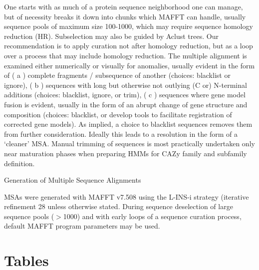 \documentclass{article}
\begin{document}
One starts with as much of a protein sequence neighborhood one can manage, but of necessity breaks it down into chunks which MAFFT can handle, usually sequence pools of maximum size 100-1000, which may require sequence homology reduction (HR). Subselection may also be guided by Aclust trees. Our recommendation is to apply curation not after homology reduction, but as a loop over a process that may include homology reduction. The multiple alignment is examined either numerically or visually for anomalies, usually evident in the form of ( a ) complete fragments / subsequence of another (choices: blacklist or ignore), ( b ) sequences with long but otherwise not outlying (C or) N-terminal additions (choices: blacklist, ignore, or trim), ( c ) sequences where gene model fusion is evident, usually in the form of an abrupt change of gene structure and composition (choices: blacklist, or develop tools to facilitate registration of corrected gene models). As implied, a choice to blacklist sequences removes them from further consideration. Ideally this leads to a resolution in the form of a ‘cleaner’ MSA. Manual trimming of sequences is most practically undertaken only near maturation phases when preparing HMMs for CAZy family and subfamily definition.


Generation of Multiple Sequence Alignments

MSAs were generated with MAFFT v7.508 using the L-INS-i strategy (iterative refinement 28 unless otherwise stated. During sequence deselection of large sequence pools ($>$1000) and with early loops of a sequence curation process, default MAFFT program parameters may be used.





\clearpage

\section{Tables}
\end{document}
